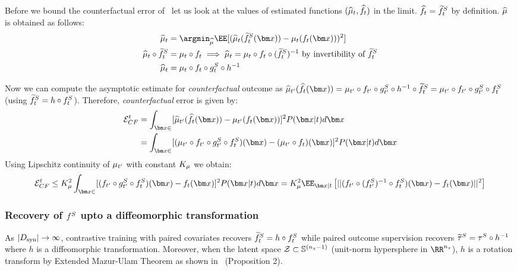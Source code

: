 Before we bound the counterfactual error of \muonly\, let us look at the values of estimated functions $(\widehat{\mu}_t, \widehat{f}_t)$ in the limit. $\widehat{f}_t = \widetilde{f}^S_t$ by definition. $\widehat{\mu}$ is obtained as follows:
\begin{align*}
    \realmuhat_t &= \argmin_{\realmuhat}\EE[(\realmuhat_t(\SInvTilde_t(\xb)) - \realmu_t(\RInv_t(\xb)))^2]\\
    \realmuhat_t \circ \SInvTilde_t &= \realmu_t \circ \RInv_t \implies \realmuhat_t = \realmu_t \circ \RInv_t \circ (\SInvTilde_t)^{-1} \text{ by invertibility of $\SInvTilde_t$}\\
    \realmuhat_t &= \realmu_t \circ \RInv_t \circ \S_t \circ h^{-1}
\end{align*}

Now we can compute the asymptotic estimate for \textit{counterfactual} outcome as $\realmuhat_{t'}(\RInvhat_{t}(\xb)) = \realmu_{t'} \circ \RInv_{t'} \circ \S_{t'} \circ h^{-1} \circ \SInvTilde_t = \realmu_{t'} \circ \RInv_{t'} \circ \S_{t'} \circ \SInv_t$ (using $\widetilde{f}^S_t = h \circ f^S_t$). Therefore, \textit{counterfactual} error is given by:
\begin{align*}
    \ErrCF^t &= \int_{\xb \in \xspace}[\realmuhat_{t'}(\RInvhat_{t}(\xb)) - \realmu_{t'}(\RInv_{t}(\xb))]^2 P(\xb|t)d\xb\\
    &= \int_{\xb \in \xspace}[(\realmu_{t'} \circ \RInv_{t'} \circ \S_{t'} \circ \SInv_t)(\xb) - (\realmu_{t'}\circ \RInv_{t})(\xb)]^2 P(\xb|t)d\xb\\
\end{align*}
Using Lipschitz continuity of $\mu_{t'}$ with constant $K_{\mu}$ we obtain:
\begin{align*}
    \ErrCF^t &\leq K_{\realmu}^2\int_{\xb \in \xspace}[(\RInv_{t'} \circ \S_{t'} \circ \SInv_t)(\xb) - \RInv_{t}(\xb)]^2 P(\xb|t)d\xb = K_{\realmu}^2\EE_{\xb|t}\left[||(\RInv_{t'} \circ (\SInv_{t'})^{-1} \circ \SInv_t)(\xb) - \RInv_{t}(\xb)||^2\right]\\
\end{align*}
\fi
\subsubsection{Recovery of $f^S$ upto a diffeomorphic transformation}
\label{app:sec:mazurulam}
\begin{lemma}
    As $|D_{\text{syn}}| \rightarrow \infty$, contrastive training with paired covariates recovers $\widetilde{f}^S_t = h \circ f^S_t$ while paired outcome supervision recovers $\widetilde{\tau}^S = \tau^S \circ h^{-1}$ where $h$ is a diffeomorphic transformation. 
    Moreover, when the latent space $\mathcal{Z} \subset \mathbb{S}^{(n_z - 1)}$ (unit-norm hypersphere in $\RR^{n_z}$), $h$ is a rotation transform by Extended Mazur-Ulam Theorem as shown in~\citep{zimmermann2021cl} (Proposition 2).
    \label{app:lemma:cl_rotation}
\end{lemma}


